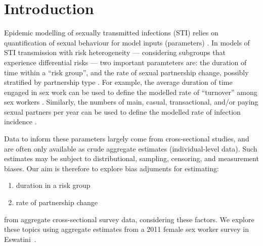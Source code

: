 \section{Introduction}
Epidemic modelling of sexually transmitted infections (STI) relies on
quantification of sexual behaviour for model inputs (parameters) \cite{Garnett2002}.
In models of STI transmission with risk heterogeneity
--- \ie considering subgroups that experience differential risks ---
two important paramteters are:
the duration of time within a ``risk group'', and
the rate of sexual partnership change, possibly stratified by partnership type
\cite{Garnett1996,Stigum1997,Watts2010,Knight2020}.
For example, the average duration of time engaged in sex work
can be used to define the modelled rate of ``turnover'' among sex workers \cite{Watts2010}.
Similarly, the numbers of main, casual, transactional, and/or paying sexual partners per year
can be used to define the modelled rate of infection incidence \cite{Boily2015}.
\par
Data to inform these parameters largely come from cross-sectional studies,
and are often only available as crude aggregate estimates (\vs individual-level data).
Such estimates may be subject to distributional, sampling, censoring, and measurement biases.
Our aim is therefore to explore bias adjuments for estimating:
\begin{enumerate}
  \item duration in a risk group
  \item rate of partnership change
\end{enumerate}
from aggregate cross-sectional survey data, considering these factors.
We explore these topics using aggregate estimates from
a 2011 female sex worker survey in Eswatini~\cite{Baral2014}.
